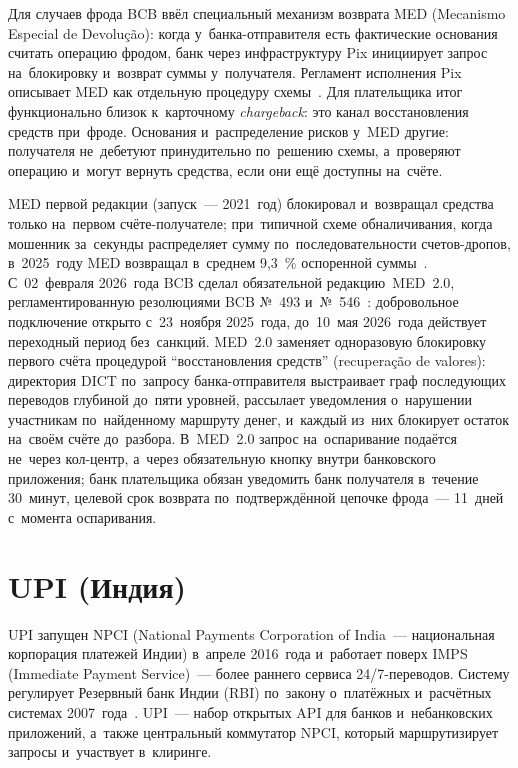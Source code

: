 Для случаев фрода BCB ввёл специальный механизм возврата MED
(Mecanismo Especial de Devolução): когда у~банка-отправителя есть фактические
основания считать операцию фродом, банк через инфраструктуру Pix
инициирует запрос на~блокировку и~возврат суммы у~получателя. Регламент
исполнения Pix описывает MED как отдельную процедуру
схемы~\cite{pix-manual-fluxos}. Для плательщика итог функционально близок
к~карточному \textit{chargeback}: это канал восстановления средств при~фроде.
Основания и~распределение рисков у~MED другие: получателя не~дебетуют
принудительно по~решению схемы, а~проверяют операцию и~могут вернуть средства,
если они ещё доступны на~счёте.

MED первой редакции (запуск~--- 2021~год) блокировал и~возвращал средства только
на~первом счёте-получателе; при~типичной схеме обналичивания, когда мошенник
за~секунды распределяет сумму по~последовательности счетов-дропов, в~2025~году
MED возвращал в~среднем 9,3~\% оспоренной суммы~\cite{bcb-med-2-0}. С~02~февраля 2026~года BCB
сделал обязательной редакцию~MED~2.0, регламентированную резолюциями BCB №~493
и~№~546~\cite{bcb-med-2-0}: добровольное подключение открыто с~23~ноября
2025~года, до~10~мая 2026~года действует переходный период без~санкций. MED~2.0
заменяет одноразовую блокировку первого счёта процедурой \enquote{восстановления
средств} (recuperação de valores): директория DICT по~запросу банка-отправителя
выстраивает граф последующих переводов глубиной до~пяти уровней, рассылает
уведомления о~нарушении участникам по~найденному маршруту денег, и~каждый из~них
блокирует остаток на~своём счёте до~разбора. В~MED~2.0 запрос на~оспаривание
подаётся не~через кол-центр, а~через обязательную кнопку внутри банковского
приложения; банк плательщика обязан уведомить банк получателя в~течение
30~минут, целевой срок возврата по~подтверждённой цепочке фрода~---
11~дней с~момента оспаривания.

\section{UPI (Индия)}\label{sec:upi-system}

UPI запущен NPCI (National Payments Corporation of India~--- национальная
корпорация платежей Индии) в~апреле 2016~года и~работает поверх IMPS (Immediate
Payment Service)~--- более раннего сервиса 24/7-переводов. Систему регулирует
Резервный банк Индии (RBI) по~закону о~платёжных и~расчётных системах
2007~года~\cite{upi}. UPI~--- набор открытых API для банков и~небанковских
приложений, а~также центральный коммутатор NPCI, который маршрутизирует запросы
и~участвует в~клиринге.

